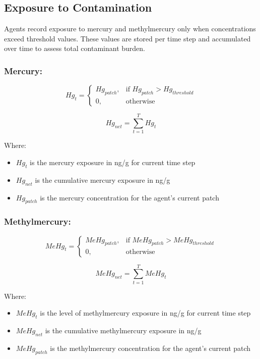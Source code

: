 \documentclass[
]{book}
\providecommand{\tightlist}{%
  \setlength{\itemsep}{0pt}\setlength{\parskip}{0pt}}
\begin{document}
\subsection{Exposure to Contamination}\label{exposure-to-contamination}

Agents record exposure to mercury and methylmercury only when concentrations exceed threshold values. These values are stored per time step and accumulated over time to assess total contaminant burden.

\subsubsection*{Mercury:}\label{mercury}

\[
Hg_{t} = \begin{cases}Hg_{patch}, & \text{if } Hg_{patch} > Hg_{threshold} \\0, & \text{otherwise}\end{cases} 
\]

\[
Hg_{net} = \sum_{t=1}^{T} Hg_{t} 
\]

Where:

\begin{itemize}
\tightlist
\item
  \(Hg_{t}\) is the mercury exposure in ng/g for current time step
\item
  \(Hg_{net}\) is the cumulative mercury exposure in ng/g
\item
  \(Hg_{patch}\) is the mercury concentration for the agent's current patch
\end{itemize}

\subsubsection*{Methylmercury:}\label{methylmercury}

\[
MeHg_{t} = \begin{cases}MeHg_{patch}, & \text{if } MeHg_{patch} > MeHg_{threshold} \\0, & \text{otherwise}\end{cases}
\]

\[
MeHg_{net} = \sum_{t=1}^{T} MeHg_{t}
\]

Where:

\begin{itemize}
\tightlist
\item
  \(MeHg_{t}\) is the level of methylmercury exposure in ng/g for current time step
\item
  \(MeHg_{net}\) is the cumulative methylmercury exposure in ng/g
\item
  \(MeHg_{patch}\) is the methylmercury concentration for the agent's current patch
\end{itemize}
\end{document}
